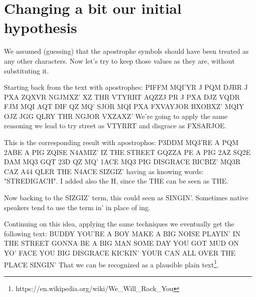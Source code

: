 \documentclass{article}
\begin{document}
\section{Changing a bit our initial hypothesis}
	
We assumed (guessing) that the apostrophe symbols should have been treated as any other characters. Now let's try to keep those values as they are, without substituting it.

Starting back from the text with apostrophes:
\bigbreak
PIFFM MQI'YR J PQM DJBR J PXA ZQXVR NGJMXZ' XZ THR VTYRRT AQZZJ PR J PXA DJZ VQDR FJM MQI AQT DIF QZ MQ' SJOR MQI PXA FXVAYJOR BXOBXZ' MQIY OJZ JGG QLRY THR NGJOR VXZAXZ'
\bigbreak
We're going to apply the same reasoning we lead to try street as VTYRRT and disgrace as FXSARJOE.

This is the corresponding result with apostrophos:
\bigbreak
P3DDM MQ3'RE A PQM 2ABE A PIG ZQISE N4AMIZ' IZ THE STREET GQZZA PE A PIG 2AZ SQ2E DAM MQ3 GQT 23D QZ MQ' 1ACE MQ3 PIG DISGRACE BICBIZ' MQ3R CAZ A44 QLER THE N4ACE SIZGIZ'
\bigbreak
having as knowing words: "STREDIGACH". I added also the H, since the THE can be seen as THE.

Now backing to the SIZGIZ' term, this could seen as SINGIN'.
Sometimes native speakers tend to use the term in' in place of ing.

Continuing on this idea, applying the same techniques we eventually get the following text:
\bigbreak
BUDDY YOU'RE A BOY MAKE A BIG NOISE PLAYIN' IN THE STREET GONNA BE A BIG MAN SOME DAY YOU GOT MUD ON YO' FACE YOU BIG DISGRACE KICKIN' YOUR CAN ALL OVER THE PLACE SINGIN'
\bigbreak
That we can be recognized as a plausible plain text\footnote{https://en.wikipedia.org/wiki/We\_Will\_Rock\_You}.
	
\end{document}

